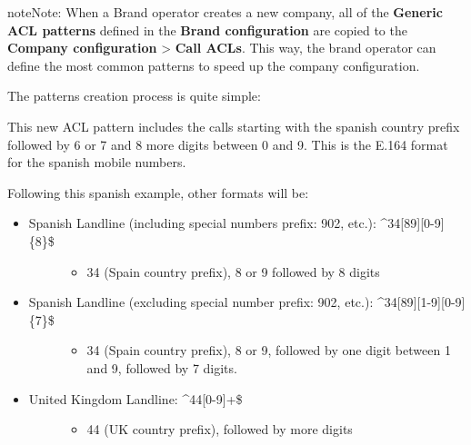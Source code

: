 \documentclass[letterpaper,10pt,english]{sphinxmanual}
\begin{document}
\begin{notice}{note}{Note:}
When a Brand operator creates a new company, all of the \textbf{Generic
ACL patterns} defined in the \textbf{Brand configuration} are copied to the
\textbf{Company configuration} \textgreater{} \textbf{Call ACLs}. This way, the brand operator can
define the most common patterns to speed up the company configuration.
\end{notice}

The patterns creation process is quite simple:

\noindent{}

This new ACL pattern includes the calls starting with the spanish country
prefix followed by 6 or 7 and 8 more digits between 0 and 9. This is the E.164
format for the spanish mobile numbers.

Following this spanish example, other formats will be:
\begin{itemize}
\item {} \begin{description}
\item[{Spanish Landline (including special numbers prefix: 902, etc.): \textasciicircum{}34{[}89{]}{[}0-9{]}\{8\}\$}] \leavevmode\begin{itemize}
\item {} 
34 (Spain country prefix), 8 or 9 followed by 8 digits

\end{itemize}

\end{description}

\item {} \begin{description}
\item[{Spanish Landline (excluding special number prefix: 902, etc.): \textasciicircum{}34{[}89{]}{[}1-9{]}{[}0-9{]}\{7\}\$}] \leavevmode\begin{itemize}
\item {} 
34 (Spain country prefix), 8 or 9, followed by one digit between 1 and 9, followed by 7 digits.

\end{itemize}

\end{description}

\item {} \begin{description}
\item[{United Kingdom Landline: \textasciicircum{}44{[}0-9{]}+\$}] \leavevmode\begin{itemize}
\item {} 
44 (UK country prefix), followed by more digits

\end{itemize}

\end{description}

\end{itemize}
\end{document}
